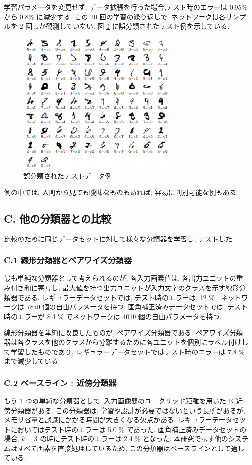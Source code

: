 \documentclass[twocolumn]{jarticle}     %
\begin{document}
学習パラメータを変更せず, データ拡張を行った場合,テスト時のエラーは 0.95\% から 0.8\% に減少する. 
この 20 回の学習の繰り返しで, ネットワークは各サンプルを 2 回しか観測していない. 
図 \ref{fig:8} に誤分類されたテスト例を示している.
\begin{figure}[t]
  \centering
  \includegraphics[width=80mm]{assets/8.eps}
  \caption{誤分類されたテストデータ例}
  \label{fig:8}
\end{figure}
例の中では, 人間から見ても曖昧なものもあれば, 容易に判別可能な例もある. 

\subsection*{C. 他の分類器との比較}
比較のために同じデータセットに対して様々な分類器を学習し, テストした.

\subsubsection*{C.1 線形分類器とペアワイズ分類器}
最も単純な分類器として考えられるのが, 各入力画素値は, 各出力ユニットの重み付き和に寄与し, 最大値を持つ出力ユニットが入力文字のクラスを示す線形分類器である.
レギュラーデータセットでは, テスト時のエラーは, 12 \% , ネットワークは 7850 個の自由パラメータを持つ. 画角補正済みデータセットでは, テスト時のエラーが 8.4 \% でネットワークは 4010 個の自由パラメータを持つ.
\par
線形分類器を単純に改良したものが, ペアワイズ分類器である. ペアワイズ分類器は各クラスを他のクラスから分離するために各ユニットを個別にラベル付けして学習したものであり, レギュラーデータセットではテスト時のエラーは 7.8 \% まで減少している.

\subsubsection*{C.2 ベースライン : 近傍分類器}
もう 1 つの単純な分類器として, 入力画像間のユークリッド距離を用いた K 近傍分類器がある.
この分類器は, 学習や設計が必要ではないという長所があるが, メモリ容量と認識にかかる時間が大きくなる欠点がある.
レギュラーデータセットにおいてはテスト時のエラーは 5.0 \% であった. 画角補正済みデータセットの場合, $k = 3$ の時にテスト時のエラーは 2.4 \% となった.
本研究で示す他のシステムはすべて画素を直接処理しているため, この分類器はベースラインとして適している.
\end{document}
